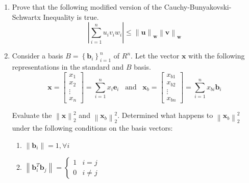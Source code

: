 \documentclass[9pt]{article}
\begin{document}
\begin{multicols}{2}
\begin{enumerate}
      \item Prove that the following modified version of the Cauchy-Bunyakovski-Schwartx Inequality is true.
      \[ \left\lvert \sum_{i=1}^{n} u_iv_iw_i \right\rvert \leq \left\lVert \mathbf{u}\right\rVert_\mathbf{w} \left\lVert \mathbf{v}\right\rVert_\mathbf{w} \]
  
      \item Consider a basis $B = \left\{\mathbf{b}_i\right\}_{i=1}^{n}$ of $R^n$. Let the vector $\mathbf{x}$ with the following representations in the standard and $B$ basis.
      \[ \mathbf{x} = \begin{bmatrix*}x_1\\x_2\\\vdots\\x_n\end{bmatrix*} = \sum_{i=1}^{n}x_i\mathbf{e}_i \,\,\,\,\, \text{and} \,\,\,\,\, \mathbf{x}_b =  \begin{bmatrix*}x_{b1}\\x_{b2}\\\vdots\\x_{bn}\end{bmatrix*} = \sum_{i=1}^{n}x_{bi}\mathbf{b}_i \]
  
      Evaluate the $\left\lVert \mathbf{x}\right\rVert_2^2$ and $\left\lVert \mathbf{x}_b\right\rVert_2^2$. Determined what happens to $\left\lVert \mathbf{x}_b\right\rVert_2^2$ under the following conditions on the basis vectors:
      \begin{enumerate}
          \item $\left\lVert \mathbf{b}_i\right\rVert = 1, \forall i$
          \item $\left\lVert \mathbf{b}_i^T\mathbf{b}_j\right\rVert = \begin{cases}
          1 & i = j\\
          0 & i \neq j
          \end{cases}$
      \end{enumerate}
  

\end{enumerate}
\end{multicols}
\end{document}
